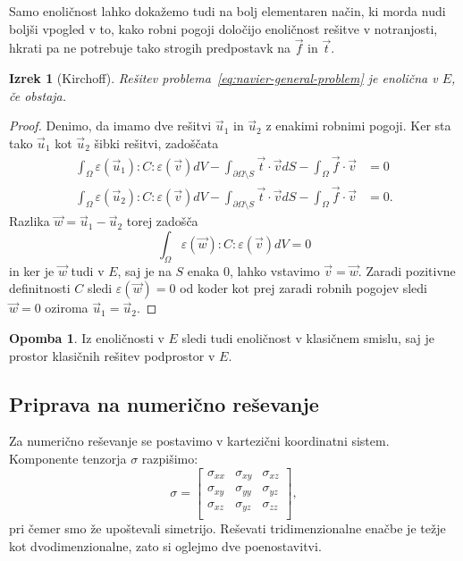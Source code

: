 \documentclass[12pt,a4paper,twoside]{article}
\theoremstyle{definition} %
\newtheorem{opomba}[definicija]{Opomba}
\theoremstyle{plain} %
\newtheorem{izrek}[definicija]{Izrek}
\numberwithin{equation}{section}
\newcommand{\eps}{\varepsilon}
\newcommand{\vv}{\vec{v}}
\newcommand{\vt}{\vec{t}}
\newcommand{\vu}{\vec{u}}
\newcommand{\vw}{\vec{w}}
\newcommand{\vf}{\vec{f}}
\newcommand{\ts}{\sigma}
\begin{document}
Samo enoličnost lahko dokažemo tudi na bolj elementaren način, ki morda nudi boljši
vpogled v to, kako robni pogoji določijo enoličnost rešitve v notranjosti, hkrati pa ne potrebuje
tako strogih predpostavk na $\vf$ in $\vt$.
\begin{izrek}[Kirchoff]
  Rešitev problema~\ref{eq:navier-general-problem} je enolična v
  $E$, če obstaja.
\end{izrek}
\begin{proof}
Denimo, da imamo dve rešitvi $\vu_1$ in $\vu_2$ z enakimi robnimi pogoji.
Ker sta tako $\vu_1$ kot $\vu_2$ šibki rešitvi, zadoščata
\begin{align*}
\int_{\Omega}\eps(\vu_1) : C : \eps(\vv) dV - \int_{\partial \Omega\setminus S} \vt\cdot \vv dS -
\int_{\Omega} \vf\cdot \vv &= 0 \\
\int_{\Omega}\eps(\vu_2) : C : \eps(\vv) dV - \int_{\partial \Omega\setminus S} \vt\cdot \vv dS -
\int_{\Omega} \vf\cdot \vv &= 0.
\end{align*}
Razlika $\vw = \vu_1 - \vu_2$ torej zadošča
\begin{equation*}
   \int_{\Omega}\eps(\vw) : C : \eps(\vv) dV = 0
\end{equation*}
in ker je $\vw$ tudi v $E$, saj je na $S$ enaka 0, lahko vstavimo $\vv = \vw$.  Zaradi pozitivne
definitnosti $C$ sledi $\eps(\vw) = 0$ od koder kot prej zaradi robnih pogojev sledi $\vw = 0$
oziroma $\vu_1 = \vu_2$.
\end{proof}
\begin{opomba}
  Iz enoličnosti v $E$ sledi tudi enoličnost v klasičnem smislu, saj je prostor klasičnih rešitev
  podprostor v $E$.
\end{opomba}

\subsection{Priprava na numerično reševanje}
Za numerično reševanje se postavimo v kartezični koordinatni sistem.
Komponente tenzorja $\ts$ razpišimo:
\begin{equation}
  \ts =
  \begin{bmatrix}
    \ts_{xx} & \ts_{xy} & \ts_{xz} \\
    \ts_{xy} & \ts_{yy} & \ts_{yz} \\
    \ts_{xz} & \ts_{yz} & \ts_{zz} \\
  \end{bmatrix},
\end{equation}
pri čemer smo že upoštevali simetrijo. Reševati tridimenzionalne enačbe je težje
kot dvodimenzionalne, zato si oglejmo dve poenostavitvi.
\end{document}
